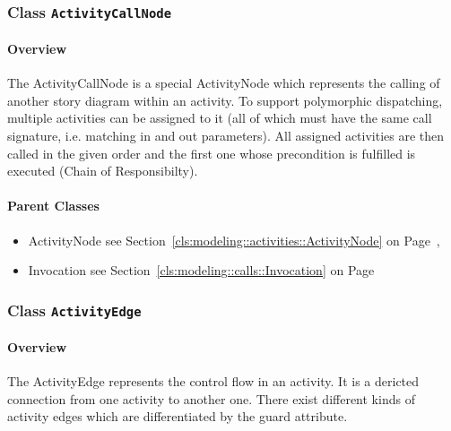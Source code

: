 \subsubsection{\Large{Class \bfseries \texttt{ActivityCallNode}\normalfont}}
\label{cls:modeling::activities::ActivityCallNode} 
\paragraph{Overview}

	
			
The ActivityCallNode is a special ActivityNode which represents the calling of another story diagram within an activity.
To support polymorphic dispatching, multiple activities can be assigned to it (all of which must have the same call signature, i.e. matching in and out parameters). All assigned activities are then called in the given order and the first one whose precondition is fulfilled is executed (Chain of Responsibilty).	
		
	



\paragraph{Parent Classes}
\begin{itemize}
\item ActivityNode see Section~\ref{cls:modeling::activities::ActivityNode} on Page~\pageref{cls:modeling::activities::ActivityNode}, \item Invocation see Section~\ref{cls:modeling::calls::Invocation} on Page~\pageref{cls:modeling::calls::Invocation}\end{itemize}
\subsubsection{\Large{Class \bfseries \texttt{ActivityEdge}\normalfont}}
\label{cls:modeling::activities::ActivityEdge} 
\paragraph{Overview}

	
			
The ActivityEdge represents the control flow in an activity. It is a dericted connection from one activity to another one. There exist different kinds of activity edges which are differentiated by the guard attribute.	
		
	


